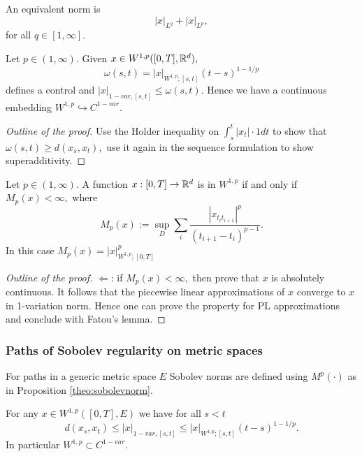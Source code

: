 \begin{lemma}
    An equivalent norm is 
    \begin{equation}
        |x|_{L^q} + |\dot{x}|_{L^p},
    \end{equation}
    for all $q \in [1,\infty].$
\end{lemma}

\begin{theorem}
    Let $p \in (1,\infty).$ Given $x \in W^{1,p}([0,T],\mathbb{R}^d),$
    \begin{equation}
        \omega(s,t) = |x|_{W^{1,p};[s,t]}(t - s)^{1 - 1/p}
    \end{equation}
    defines a control and $|x|_{1-var,[s,t]} \leq \omega(s,t).$ Hence we have a continuous embedding $W^{1,p} \hookrightarrow C^{1-var}.$
\end{theorem}
\begin{proof}[Outline of the proof]
    Use the Holder inequality on $\int_s^t |x_t| \cdot 1 dt$ to show that $\omega(s,t) \geq d(x_s, x_t),$ use it again in the sequence formulation to show superadditivity.
\end{proof}

\begin{proposition}\label{theo:sobolevnorm}
    Let $p \in (1,\infty).$ A function $x: [0,T] \rightarrow \mathbb{R}^d$ is in $W^{1,p}$ if and only if $M_p(x) < \infty,$ where
    \begin{equation}
        M_p(x) := \sup_D \sum_i \frac{|x_{t_i t_{i+1}}|^p}{(t_{i+1} - t_i)^{p-1}}.
    \end{equation}
    In this case $M_p(x) = |x|^p_{W^{1,p};[0,T]}$
\end{proposition}
\begin{proof}[Outline of the proof]
    $\Leftarrow$: if $M_p(x) < \infty,$ then prove that $x$ is absolutely continuous. 
    It follows that the piecewise linear approximations of $x$ converge to $x$ in 1-variation norm.
    Hence one can prove the property for PL approximations and conclude with Fatou's lemma.
\end{proof}

\subsubsection{Paths of Sobolev regularity on metric spaces}

For paths in a generic metric space $E$ Sobolev norms are defined using $M^p(\cdot)$ as in Proposition \ref{theo:sobolevnorm}. 

\begin{theorem}
    For any $x \in W^{1,p}([0,T], E)$ we have for all $s < t$
    \begin{equation}
        d(x_s, x_t) \leq |x|_{1-var, [s,t]} \leq |x|_{W^{1,p};[s,t]} (t - s)^{1 - 1/p}.
    \end{equation}
    In particular $W^{1,p} \subset C^{1-var}.$
\end{theorem}

